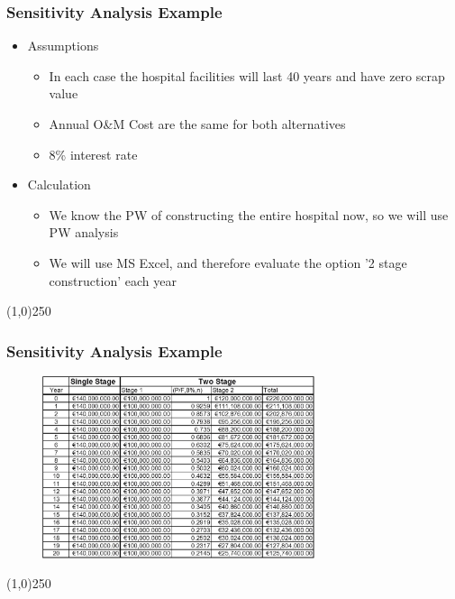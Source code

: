 			 
\begin{frame}
\frametitle{Sensitivity Analysis Example}
\begin{itemize}
\item Assumptions
\begin{itemize}
	\item In each case the hospital facilities will last 40 years and have zero scrap value
\item Annual O\&M Cost are the same for both alternatives
\item 8\% interest rate
\end{itemize}
\item Calculation
\begin{itemize}
	\item We know the PW of constructing the entire hospital now, so we will use PW analysis
\item We will use MS Excel, and therefore evaluate the option '2 stage construction' each year
\end{itemize}
\end{itemize}
\end{frame}\begin{center}\line(1,0){250}\end{center}





\begin{frame}
\frametitle{Sensitivity Analysis Example}
\begin{figure}
	\centering
		\includegraphics[width = 8cm]{images/table.jpg}
	\label{fig:sens1}
\end{figure}
\end{frame}\begin{center}\line(1,0){250}\end{center}





